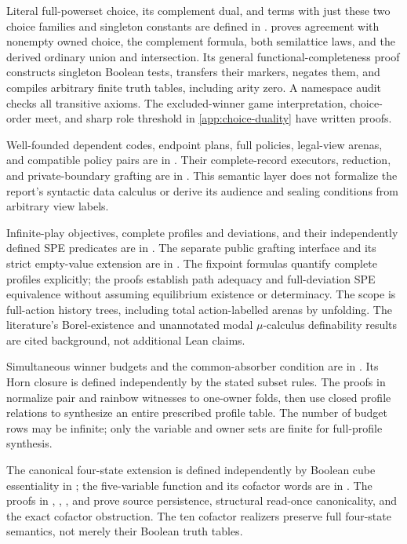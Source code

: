 Literal full-powerset choice, its complement dual, and terms with just
these two choice families and singleton constants are defined in
.
 proves agreement with nonempty
owned choice, the complement formula, both semilattice laws, and the
derived ordinary union and intersection. Its general functional-completeness
proof constructs singleton Boolean tests, transfers their markers,
negates them, and compiles arbitrary finite truth tables, including
arity zero. A namespace audit checks all transitive axioms. The
excluded-winner game interpretation, choice-order meet, and sharp role
threshold in \cref{app:choice-duality} have written proofs.

Well-founded dependent codes, endpoint plans, full policies, legal-view
arenas, and compatible policy pairs are in
. Their complete-record
executors, reduction, and private-boundary grafting are in
. This semantic layer does not formalize
the report's syntactic data calculus or derive its audience and sealing
conditions from arbitrary view labels.

Infinite-play objectives, complete profiles and deviations, and their
independently defined SPE predicates are in
. The separate public grafting
interface and its strict empty-value extension are in
. The fixpoint formulas quantify complete
profiles explicitly; the proofs establish path adequacy and full-deviation
SPE equivalence without assuming equilibrium existence or determinacy.
The scope is full-action history trees, including total action-labelled
arenas by unfolding. The literature's Borel-existence and unannotated modal
$\mu$-calculus definability results are cited background, not additional
Lean claims.

Simultaneous winner budgets and the common-absorber condition are in
. Its Horn closure is defined
independently by the stated subset rules. The proofs in
 normalize pair and rainbow witnesses
to one-owner folds, then use closed profile relations to synthesize an
entire prescribed profile table. The number of budget rows may be infinite;
only the variable and owner sets are finite for full-profile synthesis.

The canonical four-state extension is defined independently by Boolean
cube essentiality in ; the
five-variable function and its cofactor words are in .
The proofs in , ,
, and 
prove source persistence, structural read-once canonicality, and the exact
cofactor obstruction. The ten cofactor realizers preserve full four-state
semantics, not merely their Boolean truth tables.

